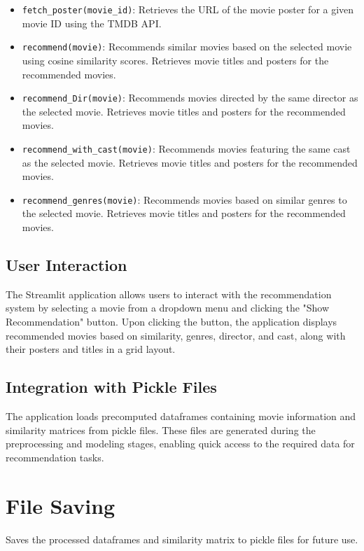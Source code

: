 \documentclass{article}
\begin{document}
\begin{itemize}
  \item \texttt{fetch\_poster(movie\_id)}: Retrieves the URL of the movie poster for a given movie ID using the TMDB API.
  
  \item \texttt{recommend(movie)}: Recommends similar movies based on the selected movie using cosine similarity scores. Retrieves movie titles and posters for the recommended movies.
  
  \item \texttt{recommend\_Dir(movie)}: Recommends movies directed by the same director as the selected movie. Retrieves movie titles and posters for the recommended movies.
  
  \item \texttt{recommend\_with\_cast(movie)}: Recommends movies featuring the same cast as the selected movie. Retrieves movie titles and posters for the recommended movies.
  
  \item \texttt{recommend\_genres(movie)}: Recommends movies based on similar genres to the selected movie. Retrieves movie titles and posters for the recommended movies.
\end{itemize}

\subsection{User Interaction}
The Streamlit application allows users to interact with the recommendation system by selecting a movie from a dropdown menu and clicking the "Show Recommendation" button. Upon clicking the button, the application displays recommended movies based on similarity, genres, director, and cast, along with their posters and titles in a grid layout.

\subsection{Integration with Pickle Files}
The application loads precomputed dataframes containing movie information and similarity matrices from pickle files. These files are generated during the preprocessing and modeling stages, enabling quick access to the required data for recommendation tasks.

\section{File Saving}
Saves the processed dataframes and similarity matrix to pickle files for future use.
\end{document}
